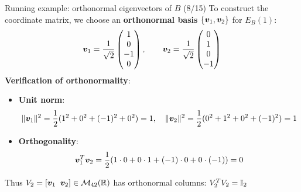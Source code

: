 \documentclass[aspectratio=169]{beamer}\usepackage[]{graphicx}\usepackage[]{xcolor}
\begin{document}
\begin{frame}{Running example: orthonormal eigenvectors of $B$ (8/15)}
To construct the coordinate matrix, we choose an \textbf{orthonormal basis} $\{\bm{v}_1, \bm{v}_2\}$ for $E_B(1)$:
\[
\bm{v}_1 = \frac{1}{\sqrt{2}}\begin{pmatrix} 1 \\ 0 \\ -1 \\ 0 \end{pmatrix}, \qquad
\bm{v}_2 = \frac{1}{\sqrt{2}}\begin{pmatrix} 0 \\ 1 \\ 0 \\ -1 \end{pmatrix}
\]
\vfill
\textbf{Verification of orthonormality}:
\begin{itemize}
\item \textbf{Unit norm}:
\[
\|\bm{v}_1\|^2 = \frac{1}{2}(1^2 + 0^2 + (-1)^2 + 0^2) = 1, \quad
\|\bm{v}_2\|^2 = \frac{1}{2}(0^2 + 1^2 + 0^2 + (-1)^2) = 1
\]
\item \textbf{Orthogonality}:
\[
\bm{v}_1^T \bm{v}_2 = \frac{1}{2}(1\cdot 0 + 0\cdot 1 + (-1)\cdot 0 + 0\cdot (-1)) = 0
\]
\end{itemize}
\vfill
Thus $V_2 = [\bm{v}_1 \;\; \bm{v}_2] \in \mathcal{M}_{42}(\mathbb{R})$ has orthonormal columns: $V_2^T V_2 = \mathbb{I}_2$
\end{frame}
\end{document}
